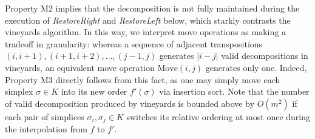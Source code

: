 \documentclass[sn-mathphys]{sn-jnl}
\begin{document}
Property M2 implies that the decomposition is not fully maintained during the execution of \textit{RestoreRight} and \textit{RestoreLeft} below, which starkly contrasts the vineyards algorithm. 
In this way, we interpret move operations as making a tradeoff in granularity: whereas a sequence of adjacent transpositions $(i, i{+}1), (i{+}1, i{+}2), \dots, (j{-}1, j)$ generates $\lvert i - j \rvert $ valid decompositions in vineyards, an equivalent move operation $\mathrm{Move}(i,j)$ generates only one.
Indeed, Property M3 directly follows from this fact, as one may simply move each simplex $\sigma \in K$ into its new order $f'(\sigma)$ via insertion sort. Note that the number of valid decomposition produced by vineyards is bounded above by $O(m^2)$ if each pair of simplices $\sigma_i, \sigma_j \in K$ switches its relative ordering at most once during the interpolation from $f$ to $f'$.
\end{document}
